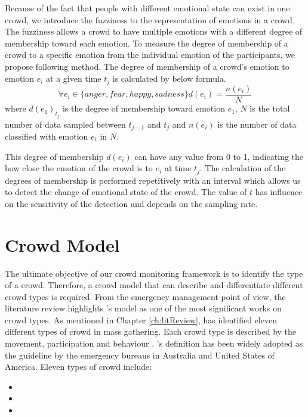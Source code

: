Because of the fact that people with different emotional state can exist in one crowd, we introduce the fuzziness to the representation of emotions in a crowd. The fuzziness allows a crowd to have multiple emotions with a different degree of membership toward each emotion. To measure the degree of membership of a crowd to a specific emotion from the individual emotion of the participants, we propose following method. The degree of membership of a crowd's emotion to emotion \(e_i\) at a given time \(t_j\) is calculated by below formula.
\[
	\forall e_i \in \{anger, fear, happy, sadness\} d(e_i) = \frac{n(e_i)}{N}
\]
where \(d(e_1)_{t_j}\) is the degree of membership toward emotion \(e_1\), \(N\) is the total number of data sampled between \(t_{j-1}\) and \(t_j\) and \(n(e_i)\) is the number of data classified with emotion \(e_i\) in \(N\).

This degree of membership \(d(e_i)\) can have any value from 0 to 1, indicating the how close the emotion of the crowd is to \(e_i\) at time \(t_j\). The calculation of the degrees of membership is performed repetitively with an interval which allows us to detect the change of emotional state of the crowd. The value of \(t\) has influence on the sensitivity of the detection and depends on the sampling rate.

\section{Crowd Model}

The ultimate objective of our crowd monitoring framework is to identify the type of a crowd. Therefore, a crowd model that can describe and differentiate different crowd types is required. From the emergency management point of view, the literature review highlights \citet{Berlonghi1995}'s model as one of the most significant works on crowd types. As mentioned in Chapter \ref{ch:litReview}, \citet{Berlonghi1995} has identified eleven different types of crowd in mass gathering. Each crowd type is described by the movement, participation and behaviour \citep{Zeitz2009}. \citet{Berlonghi1995}'s definition has been widely adopted as the guideline by the emergency bureaus in Australia and United States of America. Eleven types of crowd include:
\begin{itemize}
\item 
\item
\item
\end{itemize}

